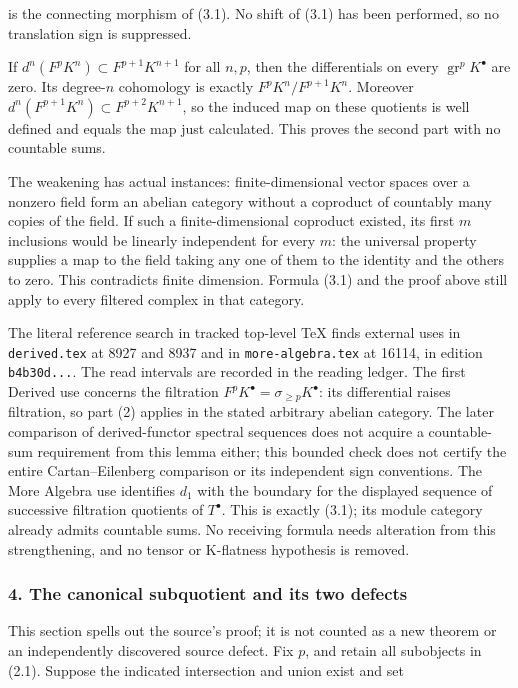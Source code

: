 is the connecting morphism of (3.1). No shift of (3.1) has been performed, so no translation sign is suppressed.

If \(d^n(F^pK^n)\subset F^{p+1}K^{n+1}\) for all \(n,p\), then the differentials on every \(\operatorname{gr}^pK^\bullet\) are zero. Its degree-\(n\) cohomology is exactly \(F^pK^n/F^{p+1}K^n\). Moreover \(d^n(F^{p+1}K^n)\subset F^{p+2}K^{n+1}\), so the induced map on these quotients is well defined and equals the map just calculated. This proves the second part with no countable sums.

The weakening has actual instances: finite-dimensional vector spaces over a nonzero field form an abelian category without a coproduct of countably many copies of the field. If such a finite-dimensional coproduct existed, its first \(m\) inclusions would be linearly independent for every \(m\): the universal property supplies a map to the field taking any one of them to the identity and the others to zero. This contradicts finite dimension. Formula (3.1) and the proof above still apply to every filtered complex in that category.

The literal reference search in tracked top-level TeX finds external uses in \texttt{derived.tex} at 8927 and 8937 and in \texttt{more-algebra.tex} at 16114, in edition \texttt{b4b30d...}. The read intervals are recorded in the reading ledger. The first Derived use concerns the filtration \(F^pK^\bullet=\sigma_{\geq p}K^\bullet\): its differential raises filtration, so part (2) applies in the stated arbitrary abelian category. The later comparison of derived-functor spectral sequences does not acquire a countable-sum requirement from this lemma either; this bounded check does not certify the entire Cartan--Eilenberg comparison or its independent sign conventions. The More Algebra use identifies \(d_1\) with the boundary for the displayed sequence of successive filtration quotients of \(T^\bullet\). This is exactly (3.1); its module category already admits countable sums. No receiving formula needs alteration from this strengthening, and no tensor or K-flatness hypothesis is removed.

\subsubsection{4. The canonical subquotient and its two defects}\label{the-canonical-subquotient-and-its-two-defects}

This section spells out the source's proof; it is not counted as a new theorem or an independently discovered source defect. Fix \(p\), and retain all subobjects in (2.1). Suppose the indicated intersection and union exist and set

